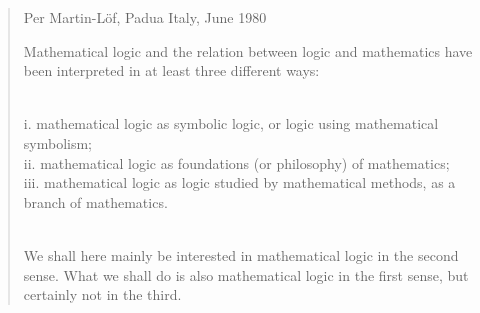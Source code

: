 \documentclass[9pt]{beamer}
\begin{document}
\begin{frame}

\begin{quote}{Per Martin-Löf, Padua Italy, June 1980}

Mathematical logic and the relation between logic and mathematics have been
interpreted in at least three different ways:
\newline

\\
i. mathematical logic as symbolic logic, or logic using mathematical symbolism; \\
ii. mathematical logic as foundations (or philosophy) of mathematics;\\
iii. mathematical logic as logic studied by mathematical methods, as a branch of mathematics.
\newline

\\
We shall here mainly be interested in mathematical logic in the second sense.
What we shall do is also mathematical logic in the first sense, but certainly
not in the third.
\end{quote}
\end{frame}
\end{document}
